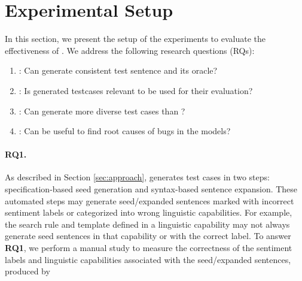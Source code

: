 \section{Experimental Setup}
\label{sec:experiment}
%


In this section, we present the setup of the experiments to evaluate the effectiveness
of \tool{}. We address the
following research questions (RQs):


\begin{enumerate}[label=\textbf{RQ\arabic*}]
\item \label{rq:one}: Can \tool generate consistent test sentence and
  its oracle?
\item \label{rq:two}: Is \tool generated testcases relevant to be used
  for their \lc evaluation?
\item \label{rq:three}: Can \tool generate more diverse test cases
  than \Cklst?
\item \label{rq:four}: Can \tool be useful to find root causes of bugs
  in the \sa models?
\end{enumerate}




\paragraph{RQ1.} As described in Section \ref{sec:approach},
\tool generates test cases in two steps: specification-based seed
generation and syntax-based sentence expansion. These automated steps
may generate seed/expanded sentences marked with incorrect sentiment
labels or categorized into wrong linguistic capabilities. For example,
the search rule and template defined in a linguistic capability may
not always generate seed sentences in that capability or with the
correct label.  To answer {\bf RQ1}, we perform a manual study to
measure the correctness of the sentiment labels and linguistic
capabilities associated with the seed/expanded sentences, produced by
\tool

